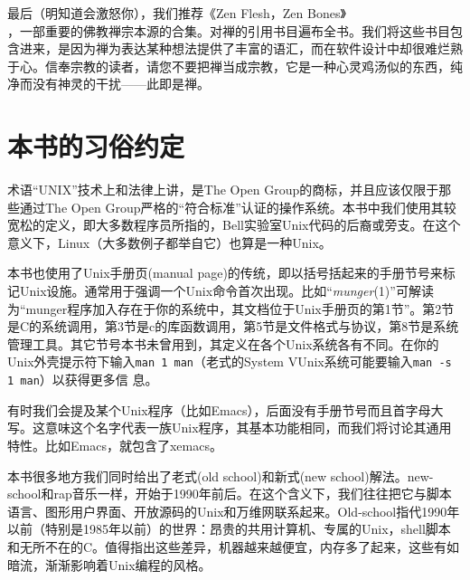 \documentclass[12pt,oneside]{book}
\begin{document}
最后（明知道会激怒你），我们推荐《Zen Flesh，Zen Bones》\\ \cite{Reps-Senzaki}，一部重要的佛教禅宗本源的合集。对禅的引用书目遍布全书。我们将这些书目包含进来，是因为禅为表达某种想法提供了丰富的语汇，而在软件设计中却很难烂熟于心。信奉宗教的读者，请您不要把禅当成宗教，它是一种心灵鸡汤似的东西，纯净而没有神灵的干扰——此即是禅。

\section{本书的习俗约定}
术语“UNIX”技术上和法律上讲，是The Open Group的商标，并且应该仅限于那些通过The Open Group严格的“符合标准”认证的操作系统。本书中我们使用其较宽松的定义，即大多数程序员所指的，Bell实验室Unix代码的后裔或旁支。在这个意义下，Linux（大多数例子都举自它）也算是一种Unix。

本书也使用了Unix手册页(manual page)的传统，即以括号括起来的手册节号来标记Unix设施。通常用于强调一个Unix命令首次出现。比如“\textit{munger}(1)”可解读为“munger程序加入存在于你的系统中，其文档位于Unix手册页的第1节”。第2节是C的系统调用，第3节是c的库函数调用，第5节是文件格式与协议，第8节是系统管理工具。其它节号本书未曾用到，其定义在各个Unix系统各有不同。在你的Unix外壳提示符下输入\verb+man 1 man+（老式的System VUnix系统可能要输入\verb+man -s 1 man+）以获得更多信
息。

有时我们会提及某个Unix程序（比如Emacs），后面没有手册节号而且首字母大写。这意味这个名字代表一族Unix程序，其基本功能相同，而我们将讨论其通用特性。比如Emacs，就包含了xemacs。

本书很多地方我们同时给出了老式(old school)和新式(new school)解法。new-school和rap音乐一样，开始于1990年前后。在这个含义下，我们往往把它与脚本语言、图形用户界面、开放源码的Unix和万维网联系起来。Old-school指代1990年以前（特别是1985年以前）的世界：昂贵的共用计算机、专属的Unix，shell脚本和无所不在的C。值得指出这些差异，机器越来越便宜，内存多了起来，这些有如暗流，渐渐影响着Unix编程的风格。
\end{document}
